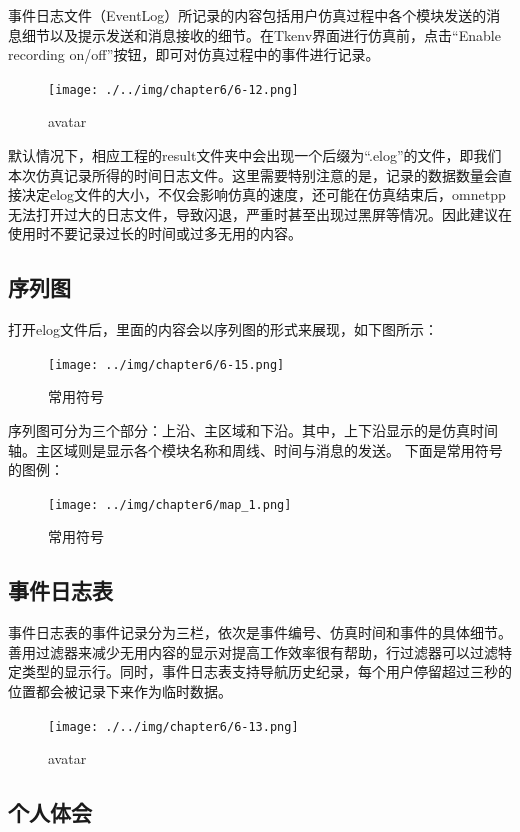 事件日志文件（EventLog）所记录的内容包括用户仿真过程中各个模块发送的消息细节以及提示发送和消息接收的细节。在Tkenv界面进行仿真前，点击“Enable recording on\slash off”按钮，即可对仿真过程中的事件进行记录。

\begin{figure}[htbp]
\centering
\texttt{[image: ./../img/chapter6/6-12.png]}
\caption{avatar}
\end{figure}

默认情况下，相应工程的result文件夹中会出现一个后缀为“.elog”的文件，即我们本次仿真记录所得的时间日志文件。这里需要特别注意的是，记录的数据数量会直接决定elog文件的大小，不仅会影响仿真的速度，还可能在仿真结束后，omnetpp无法打开过大的日志文件，导致闪退，严重时甚至出现过黑屏等情况。因此建议在使用时不要记录过长的时间或过多无用的内容。

\subsection{序列图}
\label{序列图}

打开elog文件后，里面的内容会以序列图的形式来展现，如下图所示：

\begin{figure}[htbp]
\centering
\texttt{[image: ../img/chapter6/6-15.png]}
\caption{常用符号}
\end{figure}

序列图可分为三个部分：上沿、主区域和下沿。其中，上下沿显示的是仿真时间轴。主区域则是显示各个模块名称和周线、时间与消息的发送。
下面是常用符号的图例：

\begin{figure}[htbp]
\centering
\texttt{[image: ../img/chapter6/map\_1.png]}
\caption{常用符号}
\end{figure}

\subsection{事件日志表}
\label{事件日志表}

事件日志表的事件记录分为三栏，依次是事件编号、仿真时间和事件的具体细节。
善用过滤器来减少无用内容的显示对提高工作效率很有帮助，行过滤器可以过滤特定类型的显示行。同时，事件日志表支持导航历史纪录，每个用户停留超过三秒的位置都会被记录下来作为临时数据。

\begin{figure}[htbp]
\centering
\texttt{[image: ./../img/chapter6/6-13.png]}
\caption{avatar}
\end{figure}

\subsection{个人体会}
\label{个人体会}

